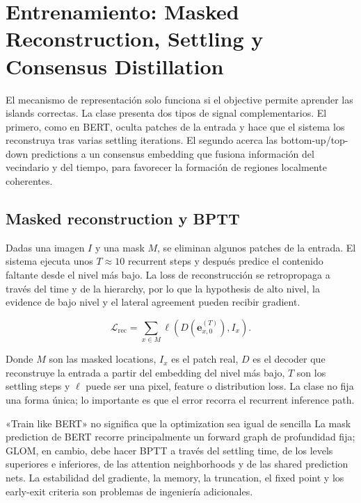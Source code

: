 \section{Entrenamiento: Masked Reconstruction, Settling y Consensus Distillation}

El mecanismo de representación solo funciona si el objective permite aprender las islands correctas. La clase presenta dos tipos de signal complementarios. El primero, como en BERT, oculta patches de la entrada y hace que el sistema los reconstruya tras varias settling iterations. El segundo acerca las bottom-up/top-down predictions a un consensus embedding que fusiona información del vecindario y del tiempo, para favorecer la formación de regiones localmente coherentes.

\subsection{Masked reconstruction y BPTT}

Dadas una imagen $I$ y una mask $M$, se eliminan algunos patches de la entrada. El sistema ejecuta unos $T\approx10$ recurrent steps y después predice el contenido faltante desde el nivel más bajo. La loss de reconstrucción se retropropaga a través del time y de la hierarchy, por lo que la hypothesis de alto nivel, la evidence de bajo nivel y el lateral agreement pueden recibir gradient.


\[
\mathcal L_{\mathrm{rec}}=
\sum_{x\in M}
\ell\!\left(D\!\left(\mathbf e_{x,0}^{(T)}\right),I_x\right).
\]

Donde $M$ son las masked locations, $I_x$ es el patch real, $D$ es el decoder que reconstruye la entrada a partir del embedding del nivel más bajo, $T$ son los settling steps y $\ell$ puede ser una pixel, feature o distribution loss. La clase no fija una forma única; lo importante es que el error recorra el recurrent inference path.

\begin{warningbox}{«Train like BERT» no significa que la optimization sea igual de sencilla}
La mask prediction de BERT recorre principalmente un forward graph de profundidad fija; GLOM, en cambio, debe hacer BPTT a través del settling time, de los levels superiores e inferiores, de las attention neighborhoods y de las shared prediction nets. La estabilidad del gradiente, la memory, la truncation, el fixed point y los early-exit criteria son problemas de ingeniería adicionales.
\end{warningbox}

